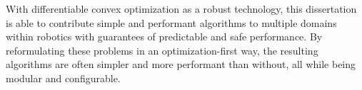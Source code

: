 With differentiable convex optimization as a robust technology, this dissertation is able to contribute simple and performant algorithms to multiple domains within robotics with guarantees of predictable and safe performance. By reformulating these problems in an optimization-first way, the resulting algorithms are often simpler and more performant than without, all while being modular and configurable.




